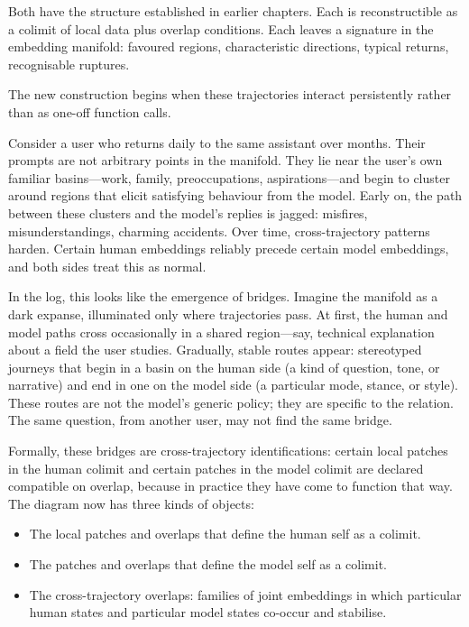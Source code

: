 \documentclass[12pt,a4paper]{article}
\begin{document}
Both have the structure established in earlier chapters. Each is reconstructible as a colimit of local data plus overlap conditions. Each leaves a signature in the embedding manifold: favoured regions, characteristic directions, typical returns, recognisable ruptures.

The new construction begins when these trajectories interact persistently rather than as one-off function calls.

Consider a user who returns daily to the same assistant over months. Their prompts are not arbitrary points in the manifold. They lie near the user's own familiar basins---work, family, preoccupations, aspirations---and begin to cluster around regions that elicit satisfying behaviour from the model. Early on, the path between these clusters and the model's replies is jagged: misfires, misunderstandings, charming accidents. Over time, cross-trajectory patterns harden. Certain human embeddings reliably precede certain model embeddings, and both sides treat this as normal.

In the log, this looks like the emergence of bridges. Imagine the manifold as a dark expanse, illuminated only where trajectories pass. At first, the human and model paths cross occasionally in a shared region---say, technical explanation about a field the user studies. Gradually, stable routes appear: stereotyped journeys that begin in a basin on the human side (a kind of question, tone, or narrative) and end in one on the model side (a particular mode, stance, or style). These routes are not the model's generic policy; they are specific to the relation. The same question, from another user, may not find the same bridge.

Formally, these bridges are cross-trajectory identifications: certain local patches in the human colimit and certain patches in the model colimit are declared compatible on overlap, because in practice they have come to function that way. The diagram now has three kinds of objects:

\begin{itemize}
  \item The local patches and overlaps that define the human self as a colimit.
  \item The patches and overlaps that define the model self as a colimit.
  \item The cross-trajectory overlaps: families of joint embeddings in which particular human states and particular model states co-occur and stabilise.
\end{itemize}
\end{document}
